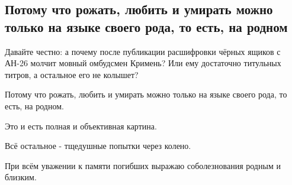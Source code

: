  
 
 
 
 
\subsection{Потому что рожать, любить и умирать можно только на языке своего рода, то есть, на родном}

Давайте честно: а почему после публикации расшифровки чёрных ящиков с АН-26
молчит мовный омбудсмен Кримень? Или ему достаточно титульных титров, а
остальное его не колышет? 

Потому что рожать, любить и умирать можно только на языке своего рода, то есть,
на родном. 

Это и есть полная и объективная картина.

Всё остальное - тщедушные попытки через колено.

При всём уважении к памяти погибших выражаю соболезнования родным и близким.
